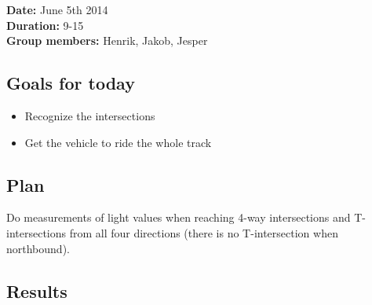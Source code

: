 \textbf{Date:} June 5th 2014\\\textbf{Duration:} 9-15\\\textbf{Group
members:} Henrik, Jakob, Jesper

\subsection{Goals for today}

\begin{itemize}
\itemsep1pt\parskip0pt
\item
  Recognize the intersections
\item
  Get the vehicle to ride the whole track
\end{itemize}

\subsection{Plan}

Do measurements of light values when reaching 4-way intersections and T-intersections from all four directions (there is no T-intersection when northbound).

\subsection{Results}


